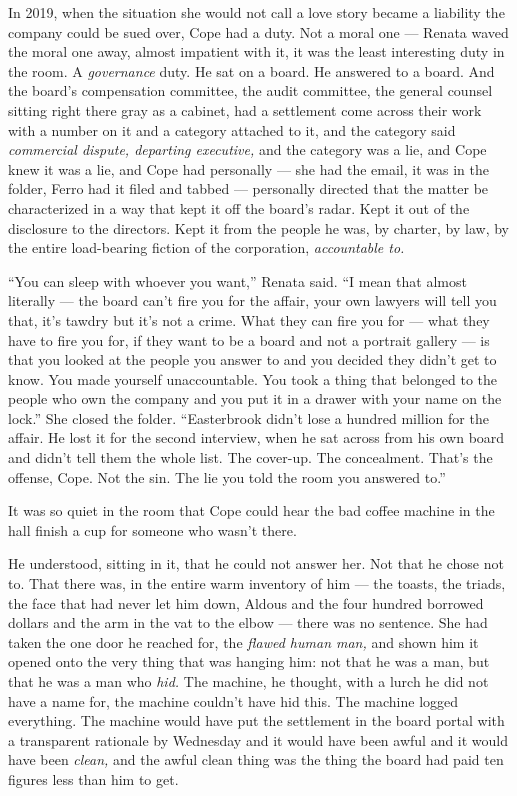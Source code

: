 \documentclass[11pt,openany]{book}
\begin{document}
In 2019, when the situation she would not call a love story became a liability the company could be sued over, Cope had a duty. Not a moral one --- Renata waved the moral one away, almost impatient with it, it was the least interesting duty in the room. A \textit{governance} duty. He sat on a board. He answered to a board. And the board's compensation committee, the audit committee, the general counsel sitting right there gray as a cabinet, had a settlement come across their work with a number on it and a category attached to it, and the category said \textit{commercial dispute, departing executive,} and the category was a lie, and Cope knew it was a lie, and Cope had personally --- she had the email, it was in the folder, Ferro had it filed and tabbed --- personally directed that the matter be characterized in a way that kept it off the board's radar. Kept it out of the disclosure to the directors. Kept it from the people he was, by charter, by law, by the entire load-bearing fiction of the corporation, \textit{accountable to.}

``You can sleep with whoever you want,'' Renata said. ``I mean that almost literally --- the board can't fire you for the affair, your own lawyers will tell you that, it's tawdry but it's not a crime. What they can fire you for --- what they have to fire you for, if they want to be a board and not a portrait gallery --- is that you looked at the people you answer to and you decided they didn't get to know. You made yourself unaccountable. You took a thing that belonged to the people who own the company and you put it in a drawer with your name on the lock.'' She closed the folder. ``Easterbrook didn't lose a hundred million for the affair. He lost it for the second interview, when he sat across from his own board and didn't tell them the whole list. The cover-up. The concealment. That's the offense, Cope. Not the sin. The lie you told the room you answered to.''

It was so quiet in the room that Cope could hear the bad coffee machine in the hall finish a cup for someone who wasn't there.

He understood, sitting in it, that he could not answer her. Not that he chose not to. That there was, in the entire warm inventory of him --- the toasts, the triads, the face that had never let him down, Aldous and the four hundred borrowed dollars and the arm in the vat to the elbow --- there was no sentence. She had taken the one door he reached for, the \textit{flawed human man,} and shown him it opened onto the very thing that was hanging him: not that he was a man, but that he was a man who \textit{hid.} The machine, he thought, with a lurch he did not have a name for, the machine couldn't have hid this. The machine logged everything. The machine would have put the settlement in the board portal with a transparent rationale by Wednesday and it would have been awful and it would have been \textit{clean,} and the awful clean thing was the thing the board had paid ten figures less than him to get.
\end{document}
